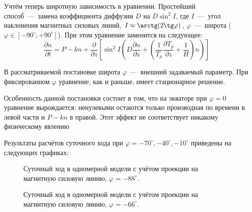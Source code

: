 \documentclass[14pt, a4paper, fleqn, twoside]{extreport}
\begin{document}
Учтём теперь широтную зависимость в уравнении. Простейший способ~---~замена коэффициента диффузии $D$ на $D\sin^2I$, где $I$~---~угол наклонения магнитных силовых линий, $I \approx \arctg(2\tg \varphi)$, $\varphi$~---~широта ($\varphi \in [-90^\circ; +90^\circ]$). При этом уравнение заменится на следующее:
$$\dfrac{\partial n}{\partial t} =P-kn+\dfrac{\partial}{\partial z}\left[\sin^2I\left(D\dfrac{\partial n}{\partial z} + \left(\dfrac{1}{T_p}\dfrac{\partial T_p}{\partial z}+\dfrac{1}{H}\right) n\right)\right]$$

В рассматриваемой постановке широта $\varphi$~---~внешний задаваемый параметр. При фиксированном $\varphi$ уравнение, как и раньше, имеет стационарное решение.

Особенность данной постановки состоит в том, что на экваторе при $\varphi=0$ уравнение вырождается: ненулевыми остаются только производная по времени в левой части и $P-kn$ в правой. Этот эффект не соответствует никакому физическому явлению

Результаты расчётов суточного хода при $\varphi = -70^\circ, -40^\circ, -10^\circ$ приведены на следующих графиках:

\begin{figure}[H]
\caption{Суточный ход в одномерной модели с учётом проекции на магнитную силовую линию, $\varphi = -88^\circ$.}
\end{figure}

\begin{figure}[H]
\caption{Суточный ход в одномерной модели с учётом проекции на магнитную силовую линию, $\varphi = -66^\circ$.}
\end{figure}
\end{document}
